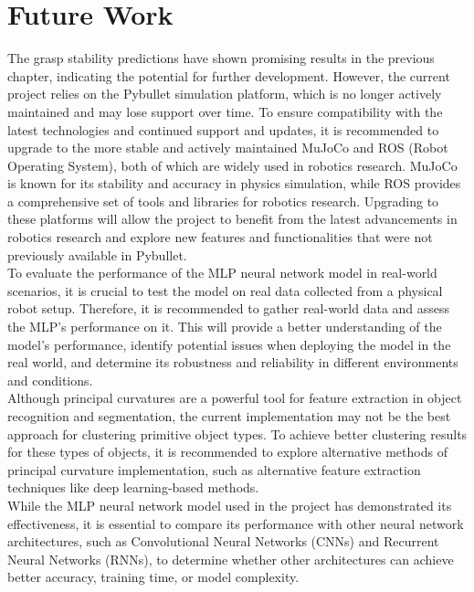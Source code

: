 \documentclass[11pt, a4paper]{report}
\begin{document}
\chapter{Future Work}
\label{chap:6}
The grasp stability predictions have shown promising results in the previous chapter, indicating the potential for further development. However, the current project relies on the Pybullet simulation platform, which is no longer actively maintained and may lose support over time. To ensure compatibility with the latest technologies and continued support and updates, it is recommended to upgrade to the more stable and actively maintained MuJoCo and ROS (Robot Operating System), both of which are widely used in robotics research. MuJoCo is known for its stability and accuracy in physics simulation, while ROS provides a comprehensive set of tools and libraries for robotics research. Upgrading to these platforms will allow the project to benefit from the latest advancements in robotics research and explore new features and functionalities that were not previously available in Pybullet.\\

To evaluate the performance of the MLP neural network model in real-world scenarios, it is crucial to test the model on real data collected from a physical robot setup. Therefore, it is recommended to gather real-world data and assess the MLP's performance on it. This will provide a better understanding of the model's performance, identify potential issues when deploying the model in the real world, and determine its robustness and reliability in different environments and conditions.\\

Although principal curvatures are a powerful tool for feature extraction in object recognition and segmentation, the current implementation may not be the best approach for clustering primitive object types. To achieve better clustering results for these types of objects, it is recommended to explore alternative methods of principal curvature implementation, such as alternative feature extraction techniques like deep learning-based methods.\\

While the MLP neural network model used in the project has demonstrated its effectiveness, it is essential to compare its performance with other neural network architectures, such as Convolutional Neural Networks (CNNs) and Recurrent Neural Networks (RNNs), to determine whether other architectures can achieve better accuracy, training time, or model complexity.\\
\end{document}
